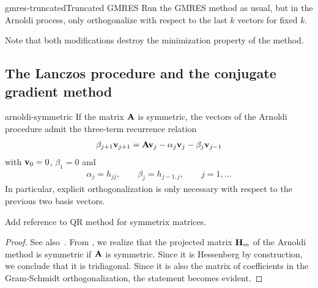\begin{Algorithm*}{gmres-truncated}{Truncated GMRES}
  Run the GMRES method as usual, but in the Arnoldi process, only
  orthogonalize with respect to the last $k$ vectors for fixed $k$.
\end{Algorithm*}

\begin{remark}
  Note that both modifications destroy the minimization property of the method.
\end{remark}

\subsection{The Lanczos procedure and the conjugate gradient method}

\begin{Lemma}{arnoldi-symmetric}
  If the matrix $\mathbf A$ is symmetric, the vectors of the Arnoldi
  procedure admit the three-term recurrence relation
  \begin{gather}
    \beta_{j+1}\mathbf v_{j+1} = \mathbf A \mathbf v_j - \alpha_j \mathbf v_j - \beta_j\mathbf v_{j-1}
  \end{gather}
  with $\mathbf v_0 = 0$, $\beta_1 = 0$ and
  \begin{gather}
    \alpha_j =  h_{jj}, \qquad \beta_j = h_{j-1,j},
    \qquad j=1,\dots
  \end{gather}
  In particular, explicit orthogonalization is only necessary with respect to
  the previous two basis vectors.
\end{Lemma}

\begin{todo}
  Add reference to QR method for symmetrix matrices.
\end{todo}
\begin{proof}
  See also~\cite[Section 6.6.1]{Saad00}. From
  , we realize that the
  projected matrix $\mathbf H_m$ of the Arnoldi method is symmetric if
  $\mathbf A$ is symmetric. Since it is Hessenberg by construction, we
  conclude that it is tridiagonal. Since it is also the matrix of
  coefficients in the Gram-Schmidt orthogonalization, the statement
  becomes evident.
\end{proof}

